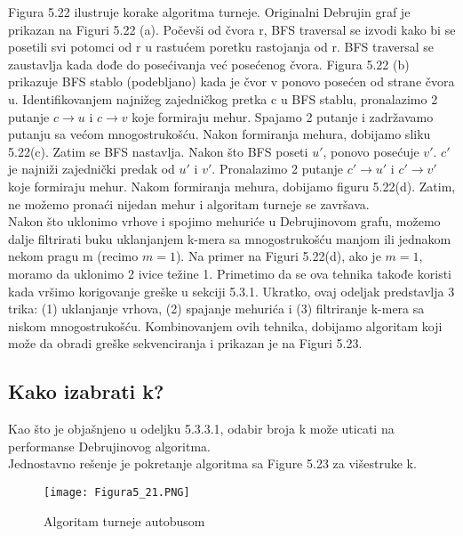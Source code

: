 \documentclass{article}
\begin{document}
Figura 5.22 ilustruje korake algoritma turneje. Originalni Debrujin graf je prikazan na Figuri 5.22 (a). Počevši od čvora r, BFS traversal se izvodi kako bi se posetili svi potomci od r u rastućem poretku rastojanja od r. BFS traversal se zaustavlja kada dođe do posećivanja već posećenog čvora. Figura 5.22 (b) prikazuje BFS stablo (podebljano) kada je čvor v ponovo posećen od strane čvora u. Identifikovanjem najnižeg zajedničkog pretka c u BFS stablu, pronalazimo 2 putanje $c \rightarrow u$ i $c \rightarrow v$ koje formiraju mehur. Spajamo 2 putanje i zadržavamo putanju sa većom mnogostrukošću. Nakon formiranja mehura, dobijamo sliku 5.22(c). Zatim se BFS nastavlja. Nakon što BFS poseti $u'$, ponovo posećuje $v'$. $c'$ je najniži zajednički predak od $u'$ i $v'$. Pronalazimo 2 putanje $c' \rightarrow u'$ i $c' \rightarrow v'$ koje formiraju mehur. Nakom formiranja mehura, dobijamo figuru 5.22(d). Zatim, ne možemo pronaći nijedan mehur i algoritam turneje se završava. \\

Nakon što uklonimo vrhove i spojimo mehuriće u Debrujinovom grafu, možemo dalje filtrirati buku uklanjanjem k-mera sa mnogostrukošću manjom ili jednakom nekom pragu m (recimo $m = 1$). Na primer na Figuri 5.22(d), ako je $m = 1$, moramo da uklonimo 2 ivice težine 1. Primetimo da se ova tehnika takođe koristi kada vršimo korigovanje greške u sekciji 5.3.1. Ukratko, ovaj odeljak predstavlja 3 trika: (1) uklanjanje vrhova, (2) spajanje mehurića i (3) filtriranje k-mera sa niskom mnogostrukošću. Kombinovanjem ovih tehnika, dobijamo algoritam koji može da obradi greške sekvenciranja i prikazan je na Figuri 5.23. \\

\subsection{Kako izabrati k?}

Kao što je objašnjeno u odeljku 5.3.3.1, odabir broja k može uticati na performanse Debrujinovog algoritma.\\

Jednostavno rešenje je pokretanje algoritma sa Figure 5.23 za višestruke k. \\

\begin{figure}[h]
\centering
\texttt{[image: Figura5\_21.PNG]}
\caption{Algoritam turneje autobusom}
\end{figure}
\end{document}
